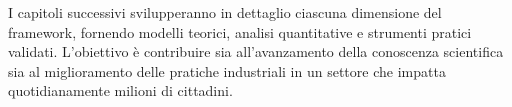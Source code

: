 I capitoli successivi svilupperanno in dettaglio ciascuna dimensione del framework, fornendo modelli teorici, analisi quantitative e strumenti pratici validati. L'obiettivo è contribuire sia all'avanzamento della conoscenza scientifica sia al miglioramento delle pratiche industriali in un settore che impatta quotidianamente milioni di cittadini.

\clearpage
\printbibliography[
    heading=subbibliography,
    title={Riferimenti Bibliografici del Capitolo 1},
]

